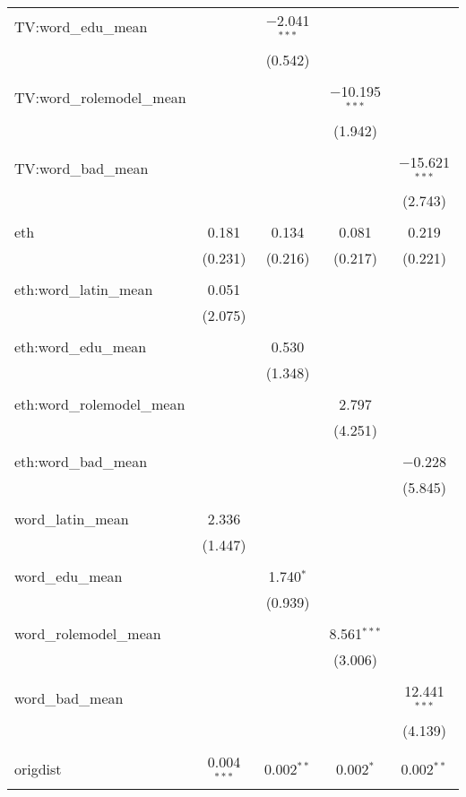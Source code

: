 \begin{table}[!htbp]
\begin{tabular}{@{\extracolsep{-2pt}}lcccc}
 TV:word\_edu\_mean &  & $-$2.041$^{***}$ &  &  \\ 
  &  & (0.542) &  &  \\ 
  & & & & \\ 
 TV:word\_rolemodel\_mean &  &  & $-$10.195$^{***}$ &  \\ 
  &  &  & (1.942) &  \\ 
  & & & & \\ 
 TV:word\_bad\_mean &  &  &  & $-$15.621$^{***}$ \\ 
  &  &  &  & (2.743) \\ 
  & & & & \\ 
 eth & 0.181 & 0.134 & 0.081 & 0.219 \\ 
  & (0.231) & (0.216) & (0.217) & (0.221) \\ 
  & & & & \\ 
 eth:word\_latin\_mean & 0.051 &  &  &  \\ 
  & (2.075) &  &  &  \\ 
  & & & & \\ 
 eth:word\_edu\_mean &  & 0.530 &  &  \\ 
  &  & (1.348) &  &  \\ 
  & & & & \\ 
 eth:word\_rolemodel\_mean &  &  & 2.797 &  \\ 
  &  &  & (4.251) &  \\ 
  & & & & \\ 
 eth:word\_bad\_mean &  &  &  & $-$0.228 \\ 
  &  &  &  & (5.845) \\ 
  & & & & \\ 
 word\_latin\_mean & 2.336 &  &  &  \\ 
  & (1.447) &  &  &  \\ 
  & & & & \\ 
 word\_edu\_mean &  & 1.740$^{*}$ &  &  \\ 
  &  & (0.939) &  &  \\ 
  & & & & \\ 
 word\_rolemodel\_mean &  &  & 8.561$^{***}$ &  \\ 
  &  &  & (3.006) &  \\ 
  & & & & \\ 
 word\_bad\_mean &  &  &  & 12.441$^{***}$ \\ 
  &  &  &  & (4.139) \\ 
  & & & & \\ 
 origdist & 0.004$^{***}$ & 0.002$^{**}$ & 0.002$^{*}$ & 0.002$^{**}$ \\ 

\end{tabular}
\end{table}
